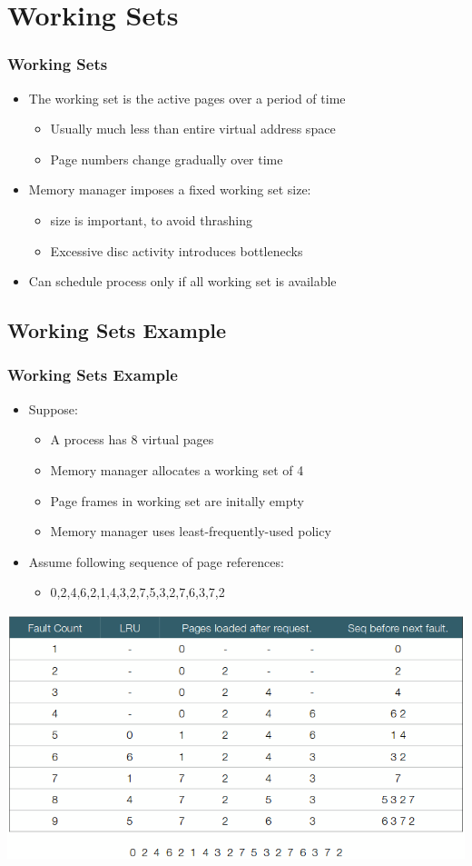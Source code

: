 \documentclass{beamer}
\begin{document}
\section{Working Sets}
\begin{frame}
\frametitle{Working Sets}
\begin{itemize}
\item The working set is the active pages over a period of time
\begin{itemize}
\item Usually much less than entire virtual address space
\item Page numbers change gradually over time
\end{itemize}
\item Memory manager imposes a fixed working set size:
\begin{itemize}
\item size is important, to avoid thrashing
\item Excessive disc activity introduces bottlenecks
\end{itemize}
\item Can schedule process only if all working set is available
\end{itemize}
\end{frame}
\subsection{Working Sets Example}
\begin{frame}
\frametitle{Working Sets Example}
\begin{itemize}
\item Suppose:
\begin{itemize}
\item A process has 8 virtual pages
\item Memory manager allocates a working set of 4
\item Page frames in working set are initally empty
\item Memory manager uses least-frequently-used policy
\end{itemize}
\item Assume following sequence of page references:
\begin{itemize}
\item 0,2,4,6,2,1,4,3,2,7,5,3,2,7,6,3,7,2	
\end{itemize}
\end{itemize}
\includegraphics[scale=0.35]{setex.png}
\end{frame}
\end{document}
